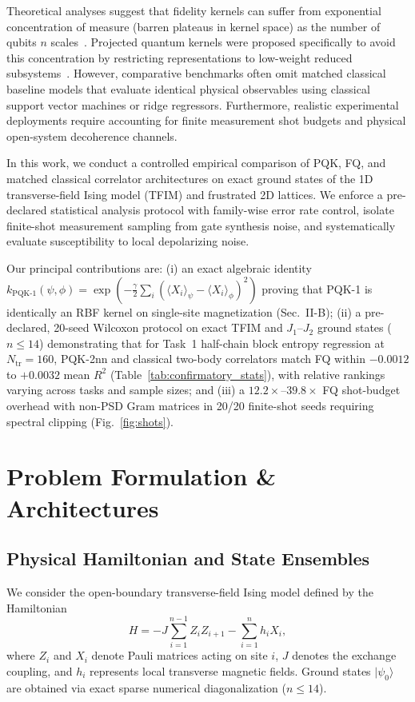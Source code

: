 \documentclass[conference]{IEEEtran}
\begin{document}
Theoretical analyses suggest that fidelity kernels can suffer from exponential concentration of measure (barren plateaus in kernel space) as the number of qubits $n$ scales~\cite{thanasilp2024, shaydulin2022}. Projected quantum kernels were proposed specifically to avoid this concentration by restricting representations to low-weight reduced subsystems~\cite{huang2021}. However, comparative benchmarks often omit matched classical baseline models that evaluate identical physical observables using classical support vector machines or ridge regressors. Furthermore, realistic experimental deployments require accounting for finite measurement shot budgets and physical open-system decoherence channels.

In this work, we conduct a controlled empirical comparison of PQK, FQ, and matched classical correlator architectures on exact ground states of the 1D transverse-field Ising model (TFIM) and frustrated 2D lattices. We enforce a pre-declared statistical analysis protocol with family-wise error rate control, isolate finite-shot measurement sampling from gate synthesis noise, and systematically evaluate susceptibility to local depolarizing noise.

Our principal contributions are: (i) an exact algebraic identity
$k_{\mathrm{PQK\text{-}1}}(\psi,\phi)=\exp(-\tfrac{\gamma}{2}\sum_i
(\langle X_i\rangle_\psi-\langle X_i\rangle_\phi)^2)$ proving that PQK-1
is identically an RBF kernel on single-site magnetization (Sec.~II-B);
(ii) a pre-declared, 20-seed Wilcoxon protocol on exact TFIM and
$J_1$--$J_2$ ground states ($n\le 14$) demonstrating that for Task~1
half-chain block entropy regression at $N_{\mathrm{tr}}=160$, PQK-2nn
and classical two-body correlators match FQ within $-0.0012$ to $+0.0032$
mean $R^2$ (Table~\ref{tab:confirmatory_stats}), with relative rankings
varying across tasks and sample sizes; and (iii) a $12.2\times$--$39.8\times$ FQ
shot-budget overhead with non-PSD Gram matrices in 20/20 finite-shot
seeds requiring spectral clipping (Fig.~\ref{fig:shots}).

\section{Problem Formulation \& Architectures}

\subsection{Physical Hamiltonian and State Ensembles}
We consider the open-boundary transverse-field Ising model defined by the Hamiltonian
\begin{equation}
H = -J \sum_{i=1}^{n-1} Z_i Z_{i+1} - \sum_{i=1}^n h_i X_i,
\label{eq:tfim}
\end{equation}
where $Z_i$ and $X_i$ denote Pauli matrices acting on site $i$, $J$ denotes the exchange coupling, and $h_i$ represents local transverse magnetic fields. Ground states $|\psi_0\rangle$ are obtained via exact sparse numerical diagonalization ($n \le 14$).
\end{document}
